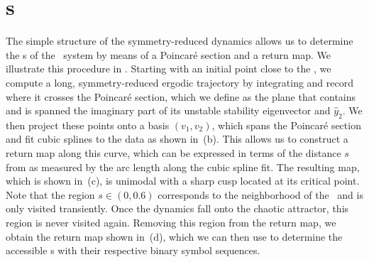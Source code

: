 \section{\Po s}
\label{s:numerics}

The simple structure of the symmetry-reduced dynamics allows us to
determine the \rpo s of the \twomode\ system by means of a Poincar\'e
section and a return map. We illustrate this procedure in
. Starting with an initial point close to the
\REQV{}{}, we compute a long, symmetry-reduced ergodic trajectory by integrating
 and record where it crosses the Poincar\'e section, which we
define as the plane that contains \REQV{}{} and is spanned the imaginary part of its unstable stability
eigenvector and $\hat{y}_2$.
We then project these points onto a basis $(v_1, v_2)$, which
spans the Poincar\'e section and fit cubic splines to the data as shown in \,(b).
This allows us to construct a return map along this curve, which can be expressed in terms of the distance $s$ from \REQV{}{}
as measured by the arc length along the cubic spline fit. The resulting map, which is shown in
\,(c), is unimodal with a sharp cusp located at its critical point.
Note that the region $s \in (0, 0.6)$ corresponds to
the neighborhood of the \reqv\  and is only visited transiently. Once the dynamics fall onto the chaotic
attractor, this region is never visited again. Removing this region from the return map, we
obtain the return map shown in \,(d), which we can then use to determine the
accessible \rpo s  with their respective binary symbol sequences.


